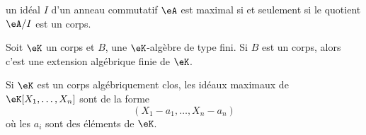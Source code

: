 \begin{theorem}       \label{ThorqTTiJ}
    un idéal \( I\) d'un anneau commutatif \( \eA\) est maximal si et seulement si le quotient \( \eA/I\) est un corps.
\end{theorem}

\begin{theorem}      \label{ThonoZyKa}
    Soit \( \eK\) un corps et \( B\), une \( \eK\)-algèbre de type fini. Si \( B\) est un corps, alors c'est une extension algébrique finie de \( \eK\).
\end{theorem}

\begin{theorem}  \label{ThowgZYqx}
    Si \( \eK\) est un corps algébriquement clos, les idéaux maximaux de \( \eK[X_1,\ldots, X_n]\) sont de la forme
    \begin{equation}
        (X_1-a_1,\ldots, X_n-a_n)
    \end{equation}
    où les \( a_i\) sont des éléments de \( \eK\).
\end{theorem}

